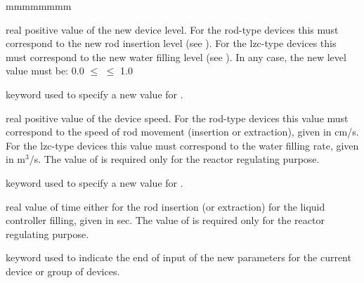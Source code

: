 \begin{ListeDeDescription}{mmmmmmmm}
\item[\dusa{value}] real positive value of the new device level. For the
rod-type devices this  must correspond to the new rod insertion
level (see ). For the lzc-type devices this 
must correspond to the new water filling level (see ).
In any case, the new level value must be: 0.0 $\leq$  $\leq$ 1.0

\item[\moc{SPEED}] keyword used to specify a new value for .

\item[\dusa{speed}] real positive value of the device speed. For the
rod-type devices this value must correspond to the speed of rod movement
(insertion or extraction), given in cm/s. For the lzc-type devices this value
must correspond to the water filling rate, given in m$^{3}$/s. The value of
 is required only for the reactor regulating purpose.

\item[\moc{TIME}] keyword used to specify a new value for .

\item[\dusa{time}] real value of time either for the rod insertion (or extraction)
 for the liquid controller filling, given in sec. The value of 
is required only for the reactor regulating purpose.

\item[\moc{END}] keyword used to indicate the end of input of the
new parameters for the current device or group of devices.

\end{ListeDeDescription}
\clearpage
